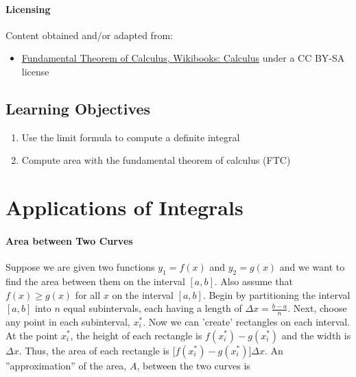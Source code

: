 \paragraph{Licensing}

Content obtained and/or adapted from:
\begin{itemize}
    \item \href{https://en.wikibooks.org/wiki/Calculus/Fundamental_Theorem_of_Calculus}{Fundamental Theorem of Calculus, Wikibooks: Calculus} under a CC BY-SA license
\end{itemize}

\subsection{Learning Objectives}

\begin{enumerate}
    \item Use the limit formula to compute a definite integral
    \item Compute area with the fundamental theorem of calculus (FTC)
\end{enumerate}

\section{Applications of Integrals}
\label{sec:applications-of-integrals}

\paragraph{Area between Two Curves}

Suppose we are given two functions $y_1 = f(x)$ and $y_2 = g(x)$ and we want to find the area between them on the interval $[a,b]$. Also assume that $f(x) \ge g(x)$ for all $x$ on the interval $[a,b]$. Begin by partitioning the interval $[a,b]$ into $n$ equal subintervals, each having a length of $\Delta x = \frac{b-a}{n}$. Next, choose any point in each subinterval, $x_i^\ast$. Now we can 'create' rectangles on each interval. At the point $x_i^\ast$, the height of each rectangle is $f(x_i^\ast) - g(x_i^\ast)$ and the width is $\Delta x$. Thus, the area of each rectangle is $\bigl[f(x_i^\ast) - g(x_i^\ast)\bigr] \Delta x$. An ''approximation'' of the area, $A$, between the two curves is


